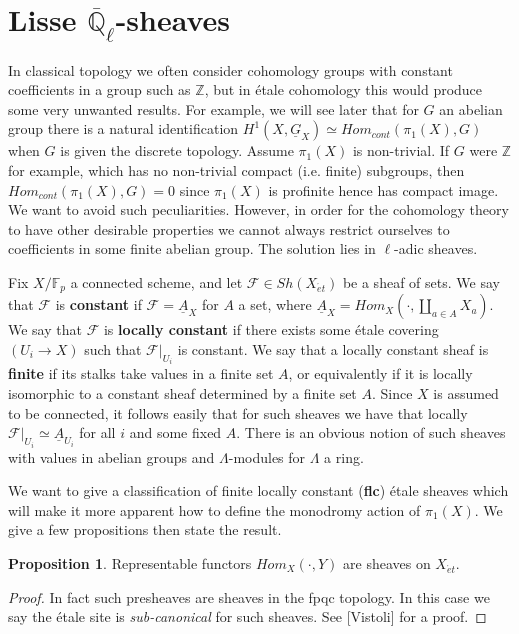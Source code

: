\documentclass{ucbthesis}
\theoremstyle{definition}
\theoremstyle{theorem}
\newtheorem{prop}[thm]{Proposition}
\begin{document}
\section{Lisse $\overline{\mathbb{Q}}_{\ell}$-sheaves}
In classical topology we often consider cohomology groups with constant coefficients in a group such as $\mathbb{Z}$, but in \'{e}tale cohomology this would produce some very unwanted results. For example, we will see later that for $G$ an abelian group there is a natural identification $H^{1}(X,\underline{G}_{X})\simeq Hom_{cont}(\pi_{1}(X),G)$ when $G$ is given the discrete topology. Assume $\pi_{1}(X)$ is non-trivial. If $G$ were $\mathbb{Z}$ for example, which has no non-trivial compact (i.e. finite) subgroups, then $Hom_{cont}(\pi_{1}(X),G)=0$ since $\pi_{1}(X)$ is profinite hence has compact image. We want to avoid such peculiarities. However, in order for the cohomology theory to have other desirable properties we cannot always restrict ourselves to coefficients in some finite abelian group. The solution lies in $\ell$-adic sheaves. 

Fix $X/\mathbb{F}_{p}$ a connected scheme, and let $\mathcal{F}\in Sh(X_{\acute{e}t})$ be a sheaf of sets.
 We say that $\mathcal{F}$ is \textbf{constant} if $\mathcal{F} = \underline{A}_{X}$ for $A$ a set, where
  $\underline{A}_{X} = Hom_{X}(\cdot,\coprod\limits_{a\in A}X_{a})$. We say that $\mathcal{F}$ is \textbf{locally
   constant} if there exists some \'{e}tale covering $(U_{i}\rightarrow X)$ such that $\mathcal{F}|_{U_{i}}$
    is constant. We say that a locally constant sheaf is \textbf{finite} if its stalks take values in a
     finite set $A$, or equivalently if it is locally isomorphic to a constant sheaf determined by a finite
      set $A$. Since $X$ is assumed to be connected, it follows easily that
       for such sheaves we have that locally $\mathcal{F}|_{U_{i}} \simeq \underline{A}_{U_{i}}$ for all $i$
        and some fixed $A$. There is an obvious notion of such sheaves with values in abelian groups and
         $\Lambda$-modules for $\Lambda$ a ring.  

 
 
We want to give a classification of finite locally constant (\textbf{flc}) \'{e}tale sheaves which will make it more apparent how to define the monodromy action of $\pi_{1}(X)$. We give a few propositions then state the result.

\begin{prop}
Representable functors $Hom_{X}(\cdot,Y)$ are sheaves on $X_{\acute{e}t}$. 
\end{prop}
\begin{proof}
In fact such presheaves are sheaves in the fpqc topology. In this case we say the \'{e}tale site is \emph{sub-canonical} for such sheaves. See [Vistoli] for a proof.
\end{proof}
\end{document}
